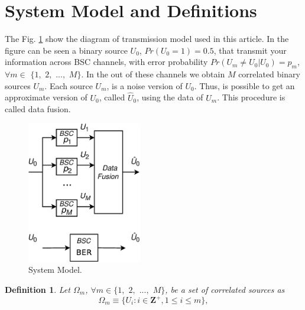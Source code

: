 \documentclass[journal]{IEEEtran}
\newtheorem{definition}[theorem]{Definition}
\begin{document}
 
\section{System Model and Definitions} 
\label{sec:SystemModel}



The Fig. \ref{fig:modelo} show the diagram of transmission model used in this 
article. In the figure can be seen a binary source $U_0$, $Pr(U_0=1)=0.5$, that
transmit your information across BSC channels, with error probability 
$Pr(U_m \ne U_0 | U_0)=p_m$, $\forall m \in$ $\{1,$ $2,$ $...,$ $M\}$. In the 
out of these channels we obtain $M$ correlated binary sources $U_m$. Each 
source $U_m$, is a noise version of $U_0$. Thus, is possible to get an approximate
version of $U_0$, called $\hat{U}_0$, using the data of $U_m$. This procedure
is called data fusion.
\begin{figure}[h!bt]
\centering
\includegraphics[width=5.0cm]{pujaico1.eps}
\caption{System Model.} \label{fig:modelo}
\end{figure}

\begin{definition}
 \label{def:omega}
Let $\Omega_m$, $\forall m \in \{1,$ $2,$ $...,$ $M\}$, be a set of correlated 
sources as
\begin{equation}
\label{eq:omega}
 \Omega_m \equiv \{U_i: i \in \mathbf{Z^+}, 1 \leq i \leq m\},
\end{equation}

\end{definition}
\end{document}
